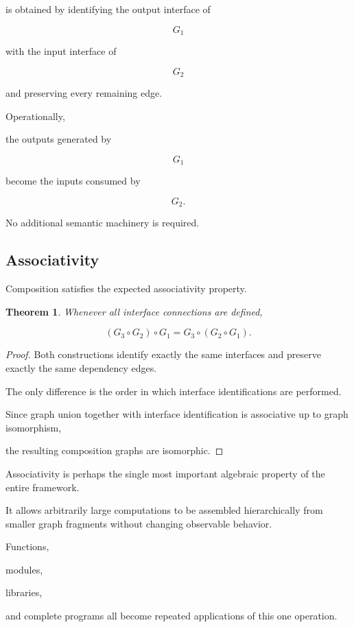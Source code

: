 \documentclass[12pt,oneside]{article}
\newtheorem{theorem}[definition]{Theorem}
\begin{document}
is obtained by identifying the output interface of

\[
G_1
\]

with the input interface of

\[
G_2
\]

and preserving every remaining edge.

Operationally,

the outputs generated by

\[
G_1
\]

become the inputs consumed by

\[
G_2.
\]

No additional semantic machinery is required.

\subsection{Associativity}

Composition satisfies the expected associativity property.

\begin{theorem}

Whenever all interface connections are defined,

\[
(G_3\circ G_2)\circ G_1
=
G_3\circ(G_2\circ G_1).
\]

\end{theorem}

\begin{proof}

Both constructions identify exactly the same interfaces and preserve exactly the same dependency edges.

The only difference is the order in which interface identifications are performed.

Since graph union together with interface identification is associative up to graph isomorphism,

the resulting composition graphs are isomorphic.

\end{proof}

Associativity is perhaps the single most important algebraic property of the entire framework.

It allows arbitrarily large computations to be assembled hierarchically from smaller graph fragments without changing observable behavior.

Functions,

modules,

libraries,

and complete programs all become repeated applications of this one operation.
\end{document}
